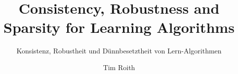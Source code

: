 \usepackage[T1]{fontenc}
\usepackage{lmodern}
\title{Consistency, Robustness and Sparsity for Learning Algorithms}
\subtitle{Konsistenz, Robustheit und Dünnbesetztheit von Lern-Algorithmen}
\author{Tim Roith}
\thesistype{}
\setpdfinfo %

\usepackage[NatClassic]{styles/fau-colors}

\usepackage[thmboxing=styleC,
			boxingstyle=styleC,
			chapterheader=styleC, 
			footerheader=styleA,
			]{styles/fau-appearence}
\usepackage{styles/fau-symbols}
%
\usepackage{kantlipsum}
\usepackage[totoc]{idxlayout}
\usepackage[final]{pdfpages}
\usepackage{subcaption}
\usetikzlibrary{positioning}
\usetikzlibrary{shapes.multipart}
\usepackage{wrapfig}


